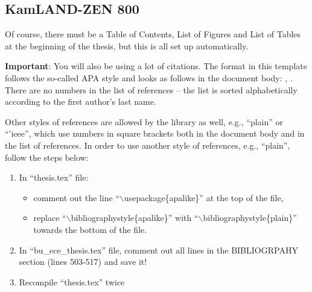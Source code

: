 \subsection{KamLAND-ZEN 800}

Of course, there must be a Table of Contents, List of Figures and List of Tables at the beginning of the thesis, but this is all set up automatically.

{\bf Important}: You will also be using a lot of citations. The format in this template follows the so-called APA style and looks as follows in the document body: \cite{lamport1985:latex}, \cite{Debr01}. There are no numbers in the list of references -- the list is sorted alphabetically according to the first author's last name.

Other styles of references are allowed by the library as well, e.g., ``plain'' or ``'ieee'', which use numbers in square brackets both in the document body and in the list of references. In order to use another style of references, e.g., ``plain'', follow the steps below:
%
\begin{enumerate}
  \item In ``thesis.tex'' file:
	\begin{itemize}
	  \item comment out the line ``$\backslash$usepackage\{apalike\}'' at the top of the file,
	  \item replace ``$\backslash$bibliographystyle\{apalike\}'' with ``$\backslash$bibliographystyle\{plain\}'' towards the bottom of the file.
	\end{itemize}
  \item In ``bu\_ece\_thesis.tex'' file, comment out all lines in the BIBLIOGRPAHY section (lines 503-517) and save it!
  \item Recompile ``thesis.tex'' twice
\end{enumerate}

